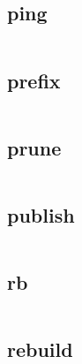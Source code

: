 \subsection{ping}



\begin{lstlisting}[language=bash]

\end{lstlisting}

\subsection{prefix}


\begin{lstlisting}[language=bash]

\end{lstlisting}

\subsection{prune}

\begin{lstlisting}[language=bash]

\end{lstlisting}

\subsection{publish}


\begin{lstlisting}[language=bash]

\end{lstlisting}

\subsection{rb}



\begin{lstlisting}[language=bash]

\end{lstlisting}

\subsection{rebuild}




\begin{lstlisting}[language=bash]

\end{lstlisting}

